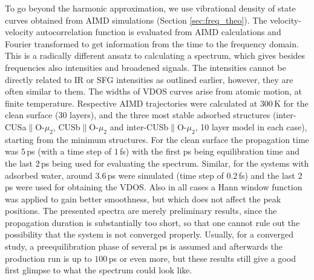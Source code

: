 \documentclass[11pt,DIV=13,BCOR=5mm,a4paper,headinclude]{scrbook}
\begin{document}
To go beyond the harmonic approximation, we use vibrational density of state curves obtained from AIMD simulations (Section \ref{sec:freq_theo}).
The velocity-velocity autocorrelation function is evaluated from AIMD calculations and Fourier transformed to get information from the time to the frequency domain.
This is a radically different ansatz to calculating a spectrum, which gives besides frequencies also intensities and broadened signals.
The intensities cannot be directly related to IR or SFG intensities as outlined earlier, however, they are often similar to them\cite{Melani2018}.
The widths of VDOS curves arise from atomic motion, at finite temperature.
Respective AIMD trajectories were calculated at $300\,$K for the clean surface (30 layers), and the three most stable adsorbed structures (inter-CUSa$\parallel$O-$\mu_2$, CUSb$\parallel$O-$\mu_2$ and inter-CUSb$\parallel$O-$\mu_2$, 10 layer model in each case), starting from the minimum structures.
For the clean surface the propagation time was $5\,$ps (with a time step of $1\,$fs) with the first ps being equilibration time and the last $2\,$ps being used for evaluating the spectrum.
Similar, for the systems with adsorbed water, around $3.6\,$ps were simulated (time step of $0.2\,$fs) and the last $2\,$ps were used for obtaining the VDOS.
Also in all cases a Hann window function was applied\cite{Ohto2015} to gain better smoothness, but which does not affect the peak positions.
The presented spectra are merely preliminary results, since the propagation duration is substantially too short, so that one cannot rule out the possibility that the system is not converged properly.
Usually, for a converged study, a preequilibration phase of several ps is assumed and afterwards the production run is up to $100\,$ps or even more, but these results still give a good first glimpse to what the spectrum could look like.
\end{document}
